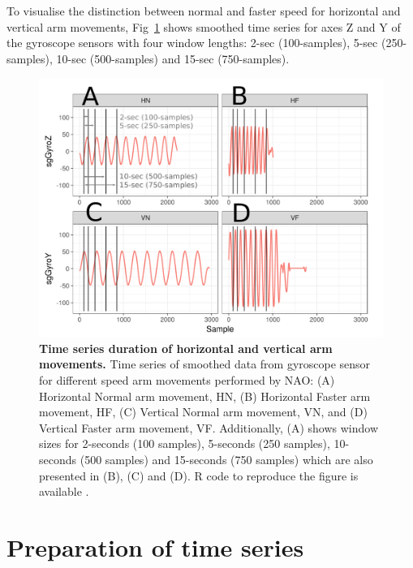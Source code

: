 To visualise the distinction between normal and faster speed for horizontal 
and vertical arm movements, Fig~\ref{fig:sts} shows smoothed time series 
for axes Z and Y of the gyroscope sensors with four window lengths: 
2-sec (100-samples), 5-sec (250-samples), 10-sec (500-samples) 
and 15-sec (750-samples).
\begin{figure}[!h] 
  \centering
  \includegraphics[width=1.0\textwidth]{sts}
    \caption{
	{\bf Time series duration of horizontal and vertical arm movements.} 
		Time series of smoothed data from gyroscope sensor 
		for different speed arm movements performed by NAO: 
		(A) Horizontal Normal arm movement, HN, 
		(B) Horizontal Faster arm movement, HF,
		(C) Vertical Normal arm movement, VN, and 
		(D) Vertical Faster arm movement, VF.
		Additionally, (A) shows window sizes for 2-seconds 
		(100 samples), 5-seconds (250 samples), 
		10-seconds (500 samples) and 15-seconds (750 samples)
		which are also presented in (B), (C) and (D).
		R code to reproduce the figure is available \cite{hwum2018}.
        }
	\label{fig:sts}
\end{figure}

\section{Preparation of time series} \label{sec:preparation_timeseries}

